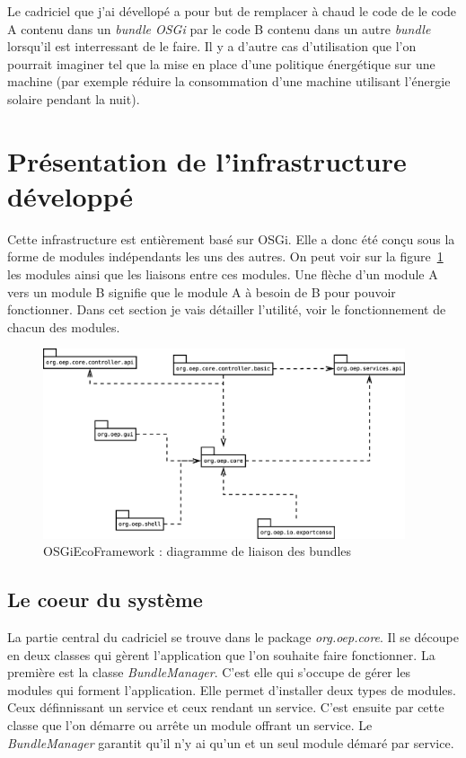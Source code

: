 \documentclass[a4paper, 11pt]{report}
\begin{document}
Le cadriciel que j'ai dévellopé a pour but de remplacer à chaud le code de le code A contenu dans un \textit{bundle OSGi} par le code B contenu dans un autre \textit{bundle} lorsqu'il est interressant de le faire. Il y a d'autre cas d'utilisation que l'on pourrait imaginer tel que la mise en place d'une politique énergétique sur une machine (par exemple réduire la consommation d'une machine utilisant l'énergie solaire pendant la nuit).

	\section{Présentation de l'infrastructure développé}
Cette infrastructure est entièrement basé sur OSGi. Elle a donc été conçu sous la forme de modules indépendants les uns des autres. On peut voir sur la figure~\ref{BdlDiag} les modules ainsi que les liaisons entre ces modules. Une flèche d'un module A vers un module B signifie que le module A à besoin de B pour pouvoir fonctionner. Dans cet section je vais détailler l'utilité, voir le fonctionnement de chacun des modules.
	
\begin{figure}
	\centering
	\includegraphics[width=0.95\textwidth]{figures/EcoPattern_Bundle_Diagramme.eps}
	\caption{OSGiEcoFramework : diagramme de liaison des bundles}
	\label{BdlDiag}
\end{figure}
\subsection{Le coeur du système}
La partie central du cadriciel se trouve dans le package \textit{org.oep.core}. Il se découpe en deux classes qui gèrent l'application que l'on souhaite faire fonctionner. La première est la classe \textit{BundleManager}. C'est elle qui s'occupe de gérer les modules qui forment l'application. Elle permet d'installer deux types de modules. Ceux définnissant un service et ceux rendant un service. C'est ensuite par cette classe que l'on démarre ou arrête un module offrant un service. Le \textit{BundleManager} garantit qu'il n'y ai qu'un et un seul module démaré par service.
\end{document}

